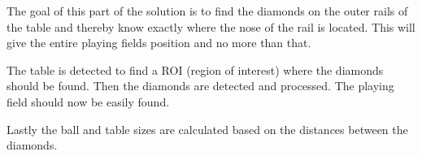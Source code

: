 The goal of this part of the solution is to find the diamonds on the outer rails of the table and thereby know exactly where the nose of the rail is located. This will give the entire playing fields position and no more than that.

The table is detected to find a ROI (region of interest) where the diamonds should be found. Then the diamonds are detected and processed. The playing field should now be easily found.

Lastly the ball and table sizes are calculated based on the distances between the diamonds.